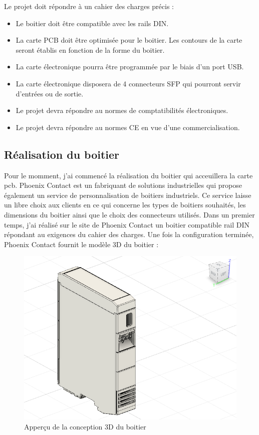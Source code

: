 Le projet doit répondre à un cahier des charges précis : 
\newline
\begin{itemize}
	\item Le boitier doit être compatible avec les rails DIN.
	\item La carte PCB doit être optimisée pour le boitier. Les contours de la carte seront établis en fonction de la forme du boitier.
	\item La carte électronique pourra être programmée par le biais d'un port USB.
	\item La carte électronique disposera de 4 connecteurs SFP qui pourront servir d'entrées ou de sortie.
	\item Le projet devra répondre au normes de comptatibilités électroniques.
	\item Le projet devra répondre au normes CE en vue d'une commercialisation. 

\end{itemize}


\subsection {Réalisation du boitier } 

Pour le momment,  j'ai commencé la réalisation du boitier qui acceuillera la carte pcb. Phoenix Contact est un fabriquant de solutions industrielles qui propose également un service de personnalisation de boitiers industriels. Ce service laisse un libre choix aux clients en ce qui concerne les types de boitiers souhaités, les dimensions du boitier ainsi que le choix des connecteurs utilisés.
\newline
Dans un premier temps, j'ai réalisé sur le site de Phoenix Contact un boitier compatible rail DIN répondant au exigences du cahier des charges. Une fois la configuration terminée, Phoenix Contact fournit le modèle 3D du boitier : 
\newpage
\begin{figure}[ht]
    \centering
    \includegraphics[scale=0.35]{img/boitier.PNG}
    \caption{Apperçu de la conception 3D du boitier }
    \label{fig:CameraCmdsettings}
\end{figure}

